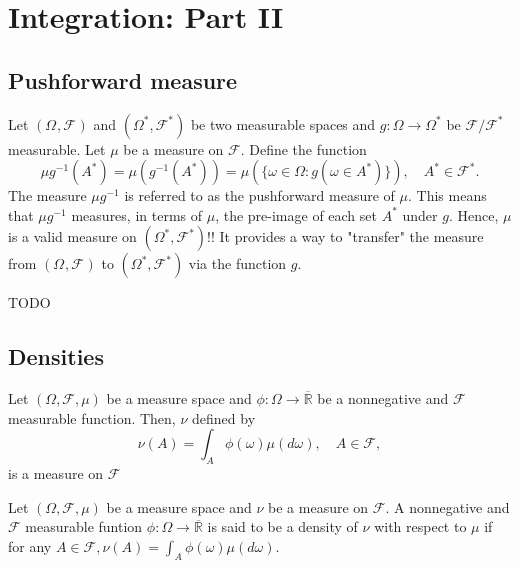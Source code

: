 \chapter{Integration: Part II}%
\label{cha:Integration: Part II}
\section{Pushforward measure}%
\label{sec:Pushforward measure}

\begin{definition}
    \label{def:9.1}
    Let $(\Omega^{ }, \mathcal{F}^{ })$ and $(\Omega^{*}, \mathcal{F}^{*})$ be two measurable
    spaces and $g: \Omega \to \Omega^{*}$ be $\mathcal{F}/\mathcal{F}^{*}$ measurable. Let
    $\mu$ be a measure on $\mathcal{F}$. Define the function
    \[
    \mu g^{-1}(A^{*}) = \mu(g^{-1}(A^{*})) =
    \mu(\{\omega \in  \Omega: g(\omega \in A^{*})\} ), \quad A^{*} \in \mathcal{F}^{*}
    .\] 
    The measure $\mu g^{-1}$ is referred to as the pushforward measure of $\mu$.
    This means that $\mu g^{-1}$ measures, in terms of $\mu$, the pre-image of each set
    $A^{*}$ under $g$. Hence, $\mu$ is a valid measure on $(\Omega^{*}, \mathcal{F}^{*})$!!
    It provides a way to "transfer" the measure from $(\Omega^{ }, \mathcal{F}^{ })$ to
    $(\Omega^{*}, \mathcal{F}^{*})$ via the function $g$.
\end{definition}

\begin{proposition}[]
    \label{prop:9.1}
    TODO
\end{proposition}

\section{Densities}%
\label{sec:Densities}
\begin{proposition}
    \label{prop:9.2}
    Let $(\Omega, \mathcal{F}, \mu)$ be a measure space and $\phi: \Omega \to 
    \overline{\mathbb{R}}$ be a nonnegative and $\mathcal{F}$ measurable function. Then,
    $\nu$ defined by
    \[
    \nu(A) = \int_{A} \phi(\omega)\mu(d\omega), \quad A \in \mathcal{F}, 
    \] 
    is a measure on $\mathcal{F}$
\end{proposition}

\begin{definition}
    \label{def:9.2}
    Let $(\Omega, \mathcal{F}, \mu)$ be a measure space and $\nu$ be a measure on $\mathcal{F}$.
    A nonnegative and $\mathcal{F}$ measurable funtion $\phi: \Omega \to \overline{\mathbb{R}}$ 
    is said to be a density of $\nu$ with respect to $\mu$ if for any $A \in \mathcal{F},
    \nu(A) = \int_{A} \phi(\omega)\mu(d\omega)$.
\end{definition}

